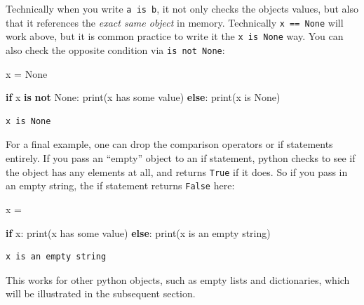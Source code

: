 \documentclass[
  letterpaper,
]{scrbook}
\newenvironment{Shaded}{\begin{snugshade}}{\end{snugshade}}
\newcommand{\BuiltInTok}[1]{\textcolor[rgb]{0.00,0.23,0.31}{#1}}
\newcommand{\ControlFlowTok}[1]{\textcolor[rgb]{0.00,0.23,0.31}{\textbf{#1}}}
\newcommand{\KeywordTok}[1]{\textcolor[rgb]{0.00,0.23,0.31}{\textbf{#1}}}
\newcommand{\NormalTok}[1]{\textcolor[rgb]{0.00,0.23,0.31}{#1}}
\newcommand{\OperatorTok}[1]{\textcolor[rgb]{0.37,0.37,0.37}{#1}}
\newcommand{\StringTok}[1]{\textcolor[rgb]{0.13,0.47,0.30}{#1}}
\newcommand{\VariableTok}[1]{\textcolor[rgb]{0.07,0.07,0.07}{#1}}
\begin{document}
Technically when you write \texttt{a\ is\ b}, it not only checks the
objects values, but also that it references the \emph{exact same object}
in memory. Technically \texttt{x\ ==\ None} will work above, but it is
common practice to write it the \texttt{x\ is\ None} way. You can also
check the opposite condition via \texttt{is\ not\ None}:

\begin{Shaded}
\begin{Highlighting}[]
\NormalTok{x }\OperatorTok{=} \VariableTok{None}

\ControlFlowTok{if}\NormalTok{ x }\KeywordTok{is} \KeywordTok{not} \VariableTok{None}\NormalTok{:}
  \BuiltInTok{print}\NormalTok{(}\StringTok{\textquotesingle{}x has some value\textquotesingle{}}\NormalTok{)}
\ControlFlowTok{else}\NormalTok{:}
  \BuiltInTok{print}\NormalTok{(}\StringTok{\textquotesingle{}x is None\textquotesingle{}}\NormalTok{)}
\end{Highlighting}
\end{Shaded}

\begin{verbatim}
x is None
\end{verbatim}

For a final example, one can drop the comparison operators or if
statements entirely. If you pass an ``empty'' object to an if statement,
python checks to see if the object has any elements at all, and returns
\texttt{True} if it does. So if you pass in an empty string, the if
statement returns \texttt{False} here:

\begin{Shaded}
\begin{Highlighting}[]
\NormalTok{x }\OperatorTok{=} \StringTok{\textquotesingle{}\textquotesingle{}}

\ControlFlowTok{if}\NormalTok{ x:}
  \BuiltInTok{print}\NormalTok{(}\StringTok{\textquotesingle{}x has some value\textquotesingle{}}\NormalTok{)}
\ControlFlowTok{else}\NormalTok{:}
  \BuiltInTok{print}\NormalTok{(}\StringTok{\textquotesingle{}x is an empty string\textquotesingle{}}\NormalTok{)}
\end{Highlighting}
\end{Shaded}

\begin{verbatim}
x is an empty string
\end{verbatim}

This works for other python objects, such as empty lists and
dictionaries, which will be illustrated in the subsequent section.
\end{document}
